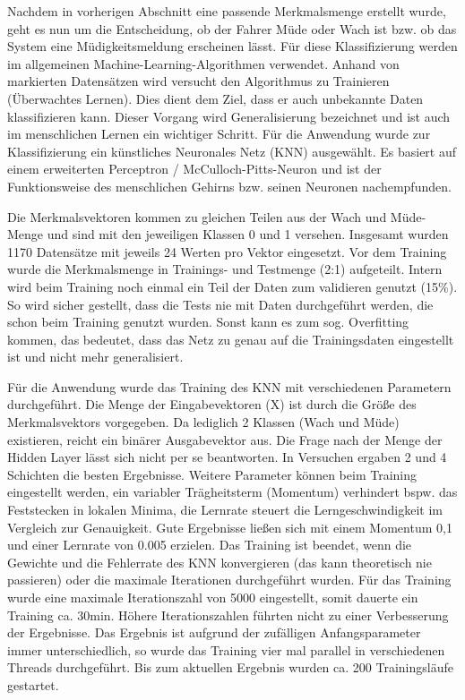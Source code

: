 \label{sec:classification}
Nachdem in vorherigen Abschnitt eine passende Merkmalsmenge erstellt wurde, geht es nun um die Entscheidung, ob der Fahrer Müde oder Wach ist bzw. ob das System eine Müdigkeitsmeldung erscheinen lässt. Für diese Klassifizierung werden im allgemeinen Machine-Learning-Algorithmen verwendet. Anhand von markierten Datensätzen wird versucht den Algorithmus zu Trainieren (Überwachtes Lernen). Dies dient dem Ziel, dass er auch unbekannte Daten klassifizieren kann. Dieser Vorgang wird Generalisierung bezeichnet und ist auch im menschlichen Lernen ein wichtiger Schritt. Für die Anwendung wurde zur Klassifizierung ein künstliches Neuronales Netz (KNN) ausgewählt. Es basiert auf einem erweiterten Perceptron / McCulloch-Pitts-Neuron \cite{ann} und ist der Funktionsweise des menschlichen Gehirns bzw. seinen Neuronen nachempfunden\cite{marsland_opac-b1129336}. \ann

Die Merkmalsvektoren kommen zu gleichen Teilen aus der Wach und Müde-Menge und sind mit den jeweiligen Klassen 0 und 1 versehen. Insgesamt wurden 1170 Datensätze mit jeweils 24 Werten pro Vektor eingesetzt. Vor dem Training wurde die Merkmalsmenge in Trainings- und Testmenge (2:1) aufgeteilt. Intern wird beim Training noch einmal ein Teil der Daten zum validieren genutzt (15\%). So wird sicher gestellt, dass die Tests nie mit Daten durchgeführt werden, die schon beim Training genutzt wurden. Sonst kann es zum sog. Overfitting kommen, das bedeutet, dass das Netz zu genau auf die Trainingsdaten eingestellt ist und nicht mehr generalisiert.

Für die Anwendung wurde das Training des KNN mit verschiedenen Parametern durchgeführt. Die Menge der Eingabevektoren (X) ist durch die Größe des Merkmalsvektors vorgegeben. Da lediglich 2 Klassen (Wach und Müde) existieren, reicht ein binärer Ausgabevektor aus. Die Frage nach der Menge der Hidden Layer lässt sich nicht per se beantworten. In Versuchen ergaben 2 und 4 Schichten die besten Ergebnisse. Weitere Parameter können beim Training eingestellt werden, ein variabler Trägheitsterm (Momentum) verhindert bspw. das Feststecken in lokalen Minima, die Lernrate steuert die Lerngeschwindigkeit im Vergleich zur Genauigkeit. Gute Ergebnisse ließen sich mit einem Momentum 0,1 und einer Lernrate von 0.005 erzielen. Das Training ist beendet, wenn die Gewichte und die Fehlerrate des KNN konvergieren (das kann theoretisch nie passieren) oder die maximale Iterationen durchgeführt wurden. Für das Training wurde eine maximale Iterationszahl von 5000 eingestellt, somit dauerte ein Training ca. 30min. Höhere Iterationszahlen führten nicht zu einer Verbesserung der Ergebnisse. Das Ergebnis ist aufgrund der zufälligen Anfangsparameter immer unterschiedlich, so wurde das Training vier mal parallel in verschiedenen Threads durchgeführt. Bis zum aktuellen Ergebnis wurden ca. 200 Trainingsläufe gestartet.

